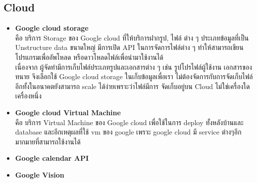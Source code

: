 \documentclass[12pt,oneside,openright,a4paper]{cpe-thai-project}
\begin{document}
\subsection{Cloud}
\begin{itemize}
\item \textbf{Google cloud storage} \\
\hspace*{1cm} คือ บริการ Storage ของ Google cloud ที่ให้บริการฝากรูป, ไฟล์ ต่าง ๆ ประเภทข้อมูลที่เป็น Unstructure data ขนาดใหญ่ มีการเปิด API ในการจัดการไฟล์ต่าง ๆ ทำให้สามารถเขียนโปรแกรมเพื่ออัพโหลด หรือดาวโหลดไฟล์เพื่อนำมาใช้งานได้ \\
\hspace*{1cm} เนื่องจาก ผู้จัดทำมีการเก็บไฟล์ประเภทรูปและเอกสารต่าง ๆ เช่น รูปโปรไฟล์ผู้ใช้งาน เอกสารของทนาย จึงเลือกใช้ Google cloud storage ในเก็บข้อมูลเพื่อเรา ไม่ต้องจัดการกับการจัดเก็บไฟล์ อีกทั้งในอนาคตยังสามารถ scale ได้ง่ายเพราะว่าไฟล์มีการ จัดเก็บอยู่บน Cloud ไม่ใช่เครื่องใดเครื่องหนึ่ง
\item \textbf{Google cloud Virtual Machine} \\
\hspace*{1cm}	คือ บริการ Virtual Machine ของ Google cloud เพื่อใช้ในการ deploy ทั้งหลังบ้านและ database และอีกเหตุผลที่ใช้ vm ของ google เพราะ google cloud มี service ต่างๆอีกมากมายที่สามารถใช้งานได้ 
\item \textbf{Google calendar API} \\
\item \textbf{Google Vision}
\end{itemize}
\end{document}
